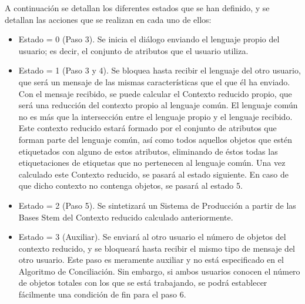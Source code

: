 A continuación se detallan los diferentes estados que se han definido, y se detallan las acciones que se realizan en cada uno de ellos:
\begin{itemize}
	\item Estado = 0 (Paso 3). Se inicia el diálogo enviando el lenguaje propio del usuario; es decir, el conjunto de atributos que el usuario utiliza. 
	\item Estado = 1 (Paso 3 y 4). Se bloquea hasta recibir el lenguaje del otro usuario, que será un mensaje de las mismas características que el que él ha enviado. Con el mensaje recibido, se puede calcular el Contexto reducido propio, que será una reducción del contexto propio al lenguaje común. El lenguaje común no es más que la intersección entre el lenguaje propio y el lenguaje recibido. Este contexto reducido estará formado por el conjunto de atributos que forman parte del lenguaje común, así como todos aquellos objetos que estén etiquetados con alguno de estos atributos, eliminando de éstos todas las etiquetaciones de etiquetas que no pertenecen al lenguaje común. Una vez calculado este Contexto reducido, se pasará al estado siguiente. En caso de que dicho contexto no contenga objetos, se pasará al estado 5.
	\item Estado = 2 (Paso 5). Se sintetizará un Sistema de Producción a partir de las Bases Stem del Contexto reducido calculado anteriormente.
	\item Estado = 3 (Auxiliar). Se enviará al otro usuario el número de objetos del contexto reducido, y se bloqueará hasta recibir el mismo tipo de mensaje del otro usuario. Este paso es meramente auxiliar y no está especificado en el Algoritmo de Conciliación. Sin embargo, si ambos usuarios conocen el número de objetos totales con los que se está trabajando, se podrá establecer fácilmente una condición de fin para el paso 6.

\end{itemize}
